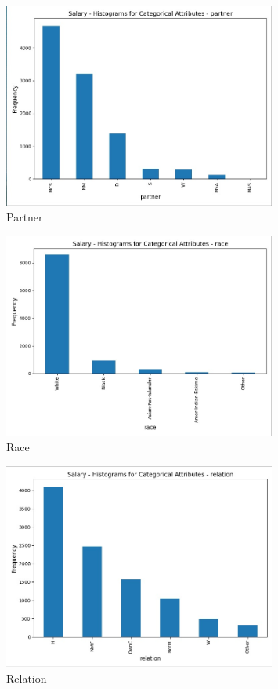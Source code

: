 \documentclass[a4paper,12pt]{article}
\begin{document}
\begin{figure}[H]
    \centering
    \includegraphics[width=0.8\textwidth]{Resources/histogram_partner.jpeg}
    \caption{Partner}
\end{figure}

\begin{figure}[H]
    \centering
    \includegraphics[width=0.8\textwidth]{Resources/histogram_race.jpeg}
    \caption{Race}
\end{figure}

\begin{figure}[H]
    \centering
    \includegraphics[width=0.8\textwidth]{Resources/histogram_relation.jpeg}
    \caption{Relation}
\end{figure}
\end{document}
